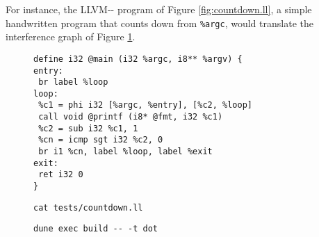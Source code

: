 \documentclass{article}
\begin{document}
\noindent For instance, the LLVM-{}- program of Figure \ref{fig:countdown.ll}, a simple handwritten program that counts down from \texttt{\%argc}, would translate the interference graph of Figure \ref{fig:countdown.dot}. %

\begin{figure}[H]
     \centering
     \begin{minipage}[b]{0.57\textwidth}
     \begin{verbatim}
define i32 @main (i32 %argc, i8** %argv) {
entry:
 br label %loop
loop:
 %c1 = phi i32 [%argc, %entry], [%c2, %loop]
 call void @printf (i8* @fmt, i32 %c1)
 %c2 = sub i32 %c1, 1
 %cn = icmp sgt i32 %c2, 0
 br i1 %cn, label %loop, label %exit
exit:
 ret i32 0
}
     \end{verbatim}
     \caption{\texttt{cat tests/countdown.ll}}\label{fig:countdown.ll}
   \end{minipage}
   \begin{minipage}[b]{0.42\textwidth}
     \centering
     
     \caption{\texttt{dune exec build -{}- -t dot}}\label{fig:countdown.dot}
   \end{minipage}
\end{figure}









\end{document}
